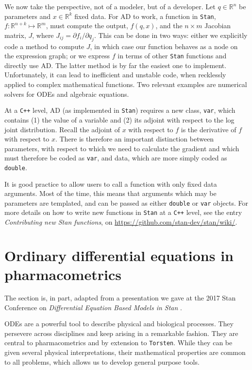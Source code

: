 \documentclass[11pt]{article}
\begin{document}
  We now take the perspective, not of a modeler, but of a developer.
  Let $q \in \mathbb{R}^n$ be parameters and $x \in \mathbb{R}^k$ fixed data. 
  For AD to work, a function in \texttt{Stan}, $f: \mathbb{R}^{n + k} \mapsto \mathbb{R}^m$, 
  must compute the output, $f(q, x)$, and the $n \times m$ Jacobian matrix, $J$, 
  where $J_{ij} = \partial f_i / \partial q_j$.
  This can be done in two ways: either we explicitly code a method to compute $J$,
  in which case our function behaves as a node on the expression graph;
  or we express $f$ in terms of other \texttt{Stan} functions and directly use AD. 
  The latter method is by far the easiest one to implement.
  Unfortunately, it can lead to inefficient and unstable code, when recklessly applied
  to complex mathematical functions. Two relevant examples are numerical solvers for
  ODEs and algebraic equations.
  
  At a \texttt{C++} level, AD (as implemented in \texttt{Stan}) requires a new class, \texttt{var}, which
  contains (1) the value of a variable and (2) its adjoint with respect to the log 
  joint distribution. Recall the adjoint of $x$ with respect to $f$ is the derivative of $f$
  with respect to $x$. There is therefore an important distinction between parameters,
  with respect to which we need to calculate the gradient and 
  which must therefore be coded as \texttt{var}, and data, which are more simply 
  coded as \texttt{double}.

 It is good practice to allow users to call a function with only fixed data arguments.
 Most of the time, this means that arguments which may be parameters are templated, 
 and can be passed as either \texttt{double} or \texttt{var} objects.
 For more details on how to write new functions in \texttt{Stan} at a \texttt{C++}
 level, see the entry \textit{Contributing new Stan functions}, 
 on \url{https://github.com/stan-dev/stan/wiki/}.
 
 \section{Ordinary differential equations in pharmacometrics}
  
  The section is, in part, adapted from a presentation we gave at the 2017 Stan 
  Conference on \textit{Differential Equation Based Models in Stan} \cite{Margossian:2017}.
  
  ODEs are a powerful tool to describe physical and biological processes.
  They persevere across disciplines and keep arising in a remarkable fashion.
  They are central to pharmacometrics and by extension to \texttt{Torsten}. 
  While they can be given several physical interpretations, their mathematical properties 
  are common to all problems, which allows us to develop general purpose tools.
\end{document}

